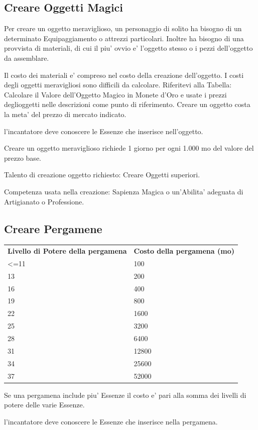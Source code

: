 \documentclass[a4paper,11pt,twoside,openany]{book}
\begin{document}
{		\pagebreak
		
		\subsection{Creare Oggetti Magici}
		
		Per creare un oggetto meraviglioso, un personaggio di solito ha bisogno di un determinato Equipaggiamento o attrezzi particolari. Inoltre ha bisogno di una provvista di materiali, di cui il piu' ovvio e' l'oggetto stesso o i pezzi dell'oggetto da assemblare. 
		
		Il costo dei materiali e' compreso nel costo della creazione dell'oggetto. I costi degli oggetti meravigliosi sono difficili da calcolare. Riferitevi alla Tabella: Calcolare il Valore dell'Oggetto Magico in Monete d'Oro e usate i prezzi deglioggetti nelle descrizioni come punto di riferimento. Creare un oggetto costa la meta' del prezzo di mercato indicato.
		
		l'incantatore deve conoscere le Essenze che inserisce nell'oggetto.
		
		Creare un oggetto meraviglioso richiede 1 giorno per ogni 1.000 mo del valore del prezzo base.
		
		Talento di creazione oggetto richiesto: Creare Oggetti superiori.
		
		Competenza usata nella creazione: Sapienza Magica o un'Abilita' adeguata
		di Artigianato o Professione.
		
		\subsection{Creare Pergamene}
		
		\begin{tabular}{ll}
			\toprule
			\textbf{Livello di Potere della pergamena} & \textbf{Costo della pergamena (mo)}\tabularnewline
			\textless=11 & 100\tabularnewline
			13 & 200\tabularnewline
			16 & 400\tabularnewline
			19 & 800\tabularnewline
			22 & 1600\tabularnewline
			25 & 3200\tabularnewline
			28 & 6400\tabularnewline
			31 & 12800\tabularnewline
			34 & 25600\tabularnewline
			37 & 52000\tabularnewline
		\end{tabular}
		
		\bigskip
		
		Se una pergamena include piu' Essenze il costo e' pari alla somma dei livelli di potere delle varie Essenze.
		
		l'incantatore deve conoscere le Essenze che inserisce nella pergamena.
		
}
\end{document}
